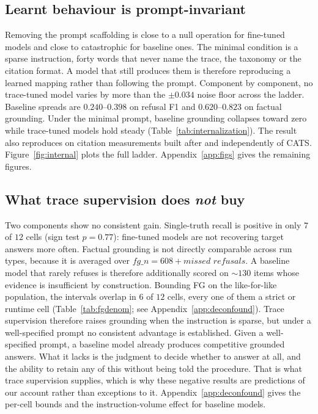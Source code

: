 \subsection{Learnt behaviour is prompt-invariant}
\label{sec:internalization}

Removing the prompt scaffolding is close to a null operation for fine-tuned
models and close to catastrophic for baseline ones. The minimal
condition is a sparse instruction, forty words that never name the
trace, the taxonomy or the citation format. A model that still produces them
is therefore reproducing a learned mapping rather than following the prompt.
Component by component, no trace-tuned model varies by more than the
$\pm0.034$ noise floor across the ladder. Baseline spreads are
$0.240$--$0.398$ on refusal F1 and $0.620$--$0.823$ on factual grounding.
Under the minimal prompt, baseline grounding collapses toward zero while
trace-tuned models hold steady (Table~\ref{tab:internalization}). The result also reproduces on
citation measurements built after and independently of CATS.
Figure~\ref{fig:internal} plots the full ladder. Appendix~\ref{app:figs} gives
the remaining figures.

\subsection{What trace supervision does \emph{not} buy}
\label{sec:whatdoesnot}

Two components show no consistent gain. Single-truth recall is positive in only
$7$ of $12$ cells (sign test $p=0.77$): fine-tuned models are not recovering
target answers more often. Factual grounding is not directly
comparable across run types, because it is averaged over
$\textit{fg\_n}=608+\textit{missed refusals}$. A baseline model that rarely
refuses is therefore additionally scored on ${\sim}130$ items whose evidence is
insufficient by construction. Bounding FG on the like-for-like population, the
intervals overlap in $6$ of $12$ cells, every one of them a strict or runtime
cell (Table~\ref{tab:fgdenom}; see Appendix~\ref{app:deconfound}). Trace supervision
therefore raises grounding when the instruction is sparse, but under a
well-specified prompt no consistent advantage is established. Given a
well-specified prompt, a baseline model already produces competitive grounded
answers. What it lacks is the judgment to decide whether to answer at all, and
the ability to retain any of this without being told the procedure. That is what
trace supervision supplies, which is why these negative results are predictions
of our account rather than exceptions to it.
Appendix~\ref{app:deconfound} gives the per-cell bounds and the
instruction-volume effect for baseline models.

